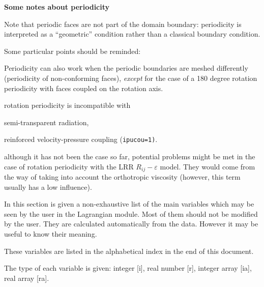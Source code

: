 {{{{\bf Some notes about periodicity}

Note that periodic faces are not part of the domain boundary:
periodicity is interpreted as a ``geometric'' condition
rather than a classical boundary condition.

Some particular points should be reminded:
\begin{list}{-}{}
\item Periodicity can also work when the periodic boundaries are meshed
      differently (periodicity of non-conforming faces), {\it except} for
      the case of a 180 degree rotation periodicity with faces coupled
      on the rotation axis.
\item rotation periodicity is incompatible with
  \begin{list}{-}{}
  \item semi-transparent radiation,
  \item reinforced velocity-pressure coupling (\texttt{ipucou=1)}.
  \end{list}
\item although it has not been the case so far, potential problems might be met
      in the case of rotation periodicity with the LRR $R_{ij}-\varepsilon$
      model. They would come from the way of taking into account the
      orthotropic viscosity (however, this term usually has a low influence).
\end{list}


In this section is given a non-exhaustive list of the main variables
which may be seen by the user in the Lagrangian module. Most of them
should not be modified by the user. They are calculated automatically
from the data. However it may be useful to know their meaning.

\noindent
These variables are listed in the alphabetical index in the end of this
document.

\noindent
The type of each variable is given: integer [i], real number [r],
integer array [ia], real array [ra].



}}}
